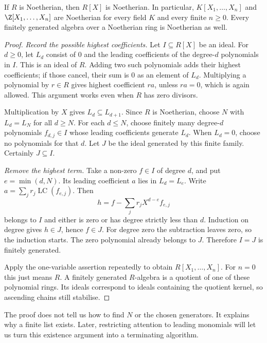 \begin{theorem}\label{thm:hilbertbasis}
If $R$ is Noetherian, then $R[X]$ is Noetherian. In particular, $K[X_1,\ldots,X_n]$ and $\Z[X_1,\ldots,X_n]$ are Noetherian for every field $K$ and every finite $n\ge0$. Every finitely generated algebra over a Noetherian ring is Noetherian as well.
\end{theorem}

\begin{proof}
\emph{Record the possible highest coefficients.} Let $I\subseteq R[X]$ be an ideal. For $d\ge0$, let $L_d$ consist of $0$ and the leading coefficients of the degree-$d$ polynomials in $I$. This is an ideal of $R$. Adding two such polynomials adds their highest coefficients; if those cancel, their sum is $0$ as an element of $L_d$. Multiplying a polynomial by $r\in R$ gives highest coefficient $ra$, unless $ra=0$, which is again allowed. This argument works even when $R$ has zero divisors.

Multiplication by $X$ gives $L_d\subseteq L_{d+1}$. Since $R$ is Noetherian, choose $N$ with $L_d=L_N$ for all $d\ge N$. For each $d\le N$, choose finitely many degree-$d$ polynomials $f_{d,j}\in I$ whose leading coefficients generate $L_d$. When $L_d=0$, choose no polynomials for that $d$. Let $J$ be the ideal generated by this finite family. Certainly $J\subseteq I$.

\emph{Remove the highest term.} Take a non-zero $f\in I$ of degree $d$, and put $e=\min(d,N)$. Its leading coefficient $a$ lies in $L_d=L_e$. Write $a=\sum_jr_j\operatorname{LC}(f_{e,j})$. Then
\[
h=f-\sum_j r_jX^{d-e}f_{e,j}
\]
belongs to $I$ and either is zero or has degree strictly less than $d$. Induction on degree gives $h\in J$, hence $f\in J$. For degree zero the subtraction leaves zero, so the induction starts. The zero polynomial already belongs to $J$. Therefore $I=J$ is finitely generated.

Apply the one-variable assertion repeatedly to obtain $R[X_1,\ldots,X_n]$. For $n=0$ this just means $R$. A finitely generated $R$-algebra is a quotient of one of these polynomial rings. Its ideals correspond to ideals containing the quotient kernel, so ascending chains still stabilise.
\end{proof}

The proof does not tell us how to find $N$ or the chosen generators. It explains why a finite list exists. Later, restricting attention to leading monomials will let us turn this existence argument into a terminating algorithm.

